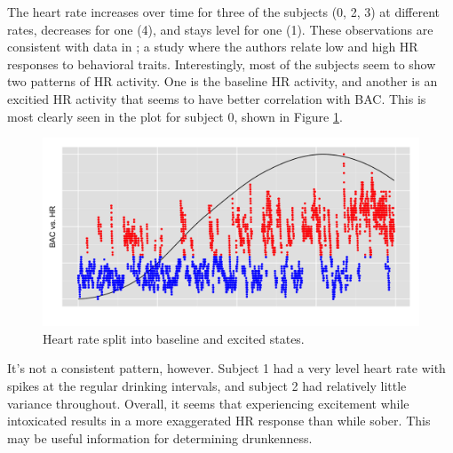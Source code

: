 The heart rate increases over time for three of the subjects (0, 2, 3) at different rates, decreases for one (4), and stays level for one (1). These observations are consistent with data in \cite{Assaad:2006}; a study where the authors relate low and high HR responses to behavioral traits. Interestingly, most of the subjects seem to show two patterns of HR activity. One is the baseline HR activity, and another is an excitied HR activity that seems to have better correlation with BAC. This is most clearly seen in the plot for subject 0, shown in Figure \ref{fig:heart_rate_split}. \begin{figure}
	\includegraphics[width=1.0\textwidth]{../figs/heart_rate_split}
	\caption{Heart rate split into baseline and excited states.}
	\label{fig:heart_rate_split}
\end{figure}It's not a consistent pattern, however. Subject 1 had a very level heart rate with spikes at the regular drinking intervals, and subject 2 had relatively little variance throughout. Overall, it seems that experiencing excitement while intoxicated results in a more exaggerated HR response than while sober. This may be useful information for determining drunkenness.

